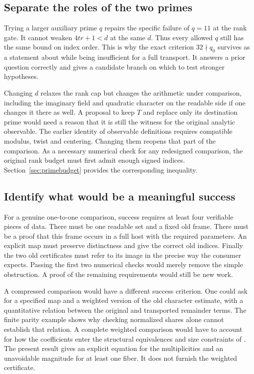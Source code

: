 \documentclass[12pt,letterpaper]{article}
\newcommand{\id}[1]{\ifmmode\text{\small\nolinkurl{#1}}\else{\small\nolinkurl{#1}}\fi}
\begin{document}
\subsection{Separate the roles of the two primes}
Trying a larger auxiliary prime $q$ repairs the specific failure of $q=11$ at the rank gate. It cannot weaken $4tr+1<d$ at the same $d$. Thus every allowed $q$ still has the same bound on index order. This is why the exact criterion $32\nmid q_0$ survives as a statement about \id{HostHyp} while being insufficient for a full transport. It answers a prior question correctly and gives a candidate branch on which to test stronger hypotheses.

Changing $d$ relaxes the rank cap but changes the arithmetic under comparison, including the imaginary field and quadratic character on the readable side if one changes it there as well. A proposal to keep $T$ and replace only its destination prime would need a reason that it is still the witness for the original analytic observable. The earlier identity of observable definitions requires compatible modulus, twist and centering. Changing them reopens that part of the comparison. As a necessary numerical check for any redesigned comparison, the original rank budget must first admit enough signed indices. Section~\ref{sec:primebudget} provides the corresponding inequality.

\subsection{Identify what would be a meaningful success}
For a genuine one-to-one comparison, success requires at least four verifiable pieces of data. There must be one readable set and a fixed old frame. There must be a proof that this frame occurs in a full host with the required parameters. An explicit map must preserve distinctness and give the correct old indices. Finally the two old certificates must refer to its image in the precise way the consumer expects. Passing the first two numerical checks would merely remove the simple obstruction. A proof of the remaining requirements would still be new work.

A compressed comparison would have a different success criterion. One could ask for a specified map and a weighted version of the old character estimate, with a quantitative relation between the original and transported remainder terms. The finite parity example shows why checking normalized shares alone cannot establish that relation. A complete weighted comparison would have to account for how the coefficients enter the structural equivalences and size constraints of \id{CoreAtH}. The present result gives an explicit equation for the multiplicities and an unavoidable magnitude for at least one fiber. It does not furnish the weighted certificate.
\end{document}

